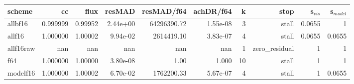 \begin{tabular}{lrrrrrrrrr}
\toprule
scheme & cc & flux & resMAD & resMAD/f64 & achDR/f64 & k & stop & s$_{vis}$ & s$_{model}$ \\
\midrule
allbf16 & 0.999999 & 0.99952 & 2.44e+00 & 64296390.72 & 1.55e-08 & 3 & stall & 0.0655 & 1 \\
allf16 & 1.000000 & 1.00002 & 9.94e-02 & 2614419.10 & 3.83e-07 & 4 & stall & 0.0655 & 0.0655 \\
allf16raw & nan & nan & nan & nan & nan & 1 & zero\_residual & 1 & 1 \\
f64 & 1.000000 & 1.00000 & 3.80e-08 & 1.00 & 1.000 & 10 & stall & 1 & 1 \\
modelf16 & 1.000000 & 1.00002 & 6.70e-02 & 1762200.33 & 5.67e-07 & 4 & stall & 1 & 0.0655 \\
\bottomrule
\end{tabular}